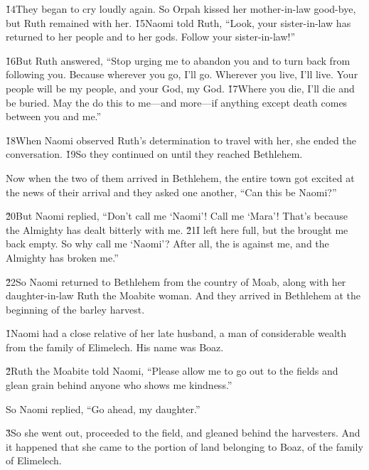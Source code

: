 \v{14}They began to cry loudly again. So Orpah kissed her mother-in-law good-bye, but Ruth remained with her. \v{15}Naomi told Ruth, ``Look, your sister-in-law has returned to her people and to her gods. Follow your sister-in-law!''

\v{16}But Ruth answered, ``Stop urging me to abandon you and to turn back from following you. Because wherever you go, I'll go. Wherever you live, I'll live. Your people will be my people, and your God, my God. \v{17}Where you die, I'll die and be buried. May the  do this to me---and more---if anything except death comes between you and me.''

\v{18}When Naomi observed Ruth's determination to travel with her, she ended the conversation. \v{19}So they continued on until they reached Bethlehem.

Now when the two of them arrived in Bethlehem, the entire town got excited at the news of their arrival and they asked one another, ``Can this be Naomi?''

\v{20}But Naomi replied, ``Don't call me `Naomi'! Call me `Mara'! That's because the Almighty has dealt bitterly with me. \v{21}I left here full, but the  brought me back empty. So why call me `Naomi'? After all, the  is against me, and the Almighty has broken me.''

\v{22}So Naomi returned to Bethlehem from the country of Moab, along with her daughter-in-law Ruth the Moabite woman. And they arrived in Bethlehem at the beginning of the barley harvest.

\v{1}Naomi had a close relative of her late husband, a man of considerable wealth from the family of Elimelech. His name was Boaz.

\v{2}Ruth the Moabite told Naomi, ``Please allow me to go out to the fields and glean grain behind anyone who shows me kindness.''

So Naomi replied, ``Go ahead, my daughter.''

\v{3}So she went out, proceeded to the field, and gleaned behind the harvesters. And it happened that she came to the portion of land belonging to Boaz, of the family of Elimelech.

